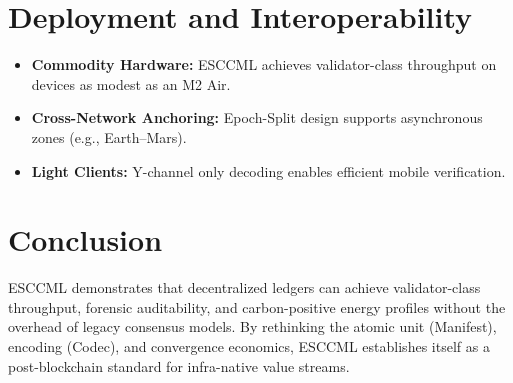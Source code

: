 \documentclass[11pt, a4paper]{article}
\begin{document}
\section{Deployment and Interoperability}
\begin{itemize}
    \item \textbf{Commodity Hardware:} ESCCML achieves validator-class throughput on devices as modest as an M2 Air.
    \item \textbf{Cross-Network Anchoring:} Epoch-Split design supports asynchronous zones (e.g., Earth–Mars).
    \item \textbf{Light Clients:} Y-channel only decoding enables efficient mobile verification.
\end{itemize}

\section{Conclusion}
ESCCML demonstrates that decentralized ledgers can achieve validator-class throughput, forensic
auditability, and carbon-positive energy profiles without the overhead of legacy consensus models.
By rethinking the atomic unit (Manifest), encoding (Codec), and convergence economics, ESCCML
establishes itself as a post-blockchain standard for infra-native value streams.
\end{document}

